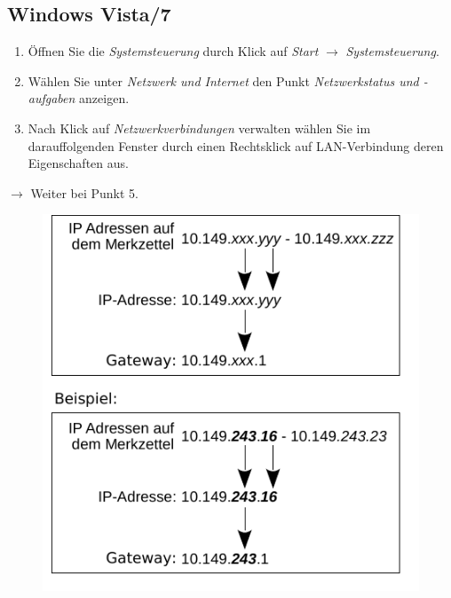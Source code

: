 \documentclass[a4paper,12pt]{scrartcl}
\begin{document}
\subsection*{Windows Vista/7}
\begin{enumerate}
    \item Öffnen Sie die \emph{Systemsteuerung} durch Klick auf \emph{Start} $\rightarrow$ \emph{Systemsteuerung}.
    \item Wählen Sie unter \emph{Netzwerk und Internet} den Punkt \emph{Netzwerkstatus und -aufgaben} anzeigen.
    \item Nach Klick auf \emph{Netzwerkverbindungen} verwalten wählen Sie im darauffolgenden Fenster durch einen Rechtsklick auf LAN-Verbindung deren Eigenschaften aus.
\end{enumerate}
$\rightarrow$ Weiter bei Punkt 5.
      \begin{figure}[h!]
	\centering
        \vspace{-5pt}
        \begin{minipage}[c]{0.45\linewidth}
          \centering
          \includegraphics[width=\linewidth,keepaspectratio]{Bilder/IP_Gerneric_mb}
        \end{minipage}
        \begin{minipage}[c]{0.48\linewidth}
          \centering

\end{minipage}
\end{figure}
\end{document}

